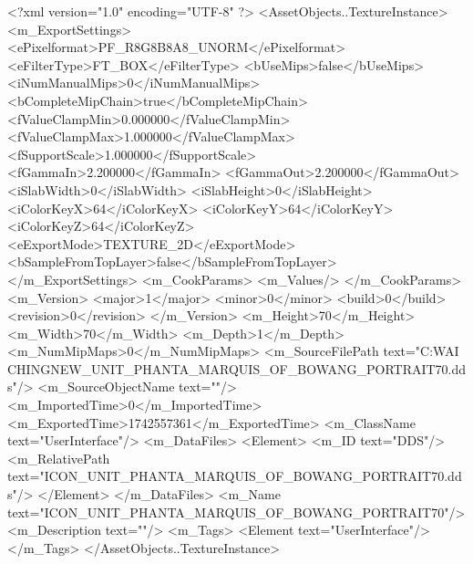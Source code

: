 <?xml version="1.0" encoding="UTF-8" ?>
<AssetObjects..TextureInstance>
	<m_ExportSettings>
		<ePixelformat>PF_R8G8B8A8_UNORM</ePixelformat>
		<eFilterType>FT_BOX</eFilterType>
		<bUseMips>false</bUseMips>
		<iNumManualMips>0</iNumManualMips>
		<bCompleteMipChain>true</bCompleteMipChain>
		<fValueClampMin>0.000000</fValueClampMin>
		<fValueClampMax>1.000000</fValueClampMax>
		<fSupportScale>1.000000</fSupportScale>
		<fGammaIn>2.200000</fGammaIn>
		<fGammaOut>2.200000</fGammaOut>
		<iSlabWidth>0</iSlabWidth>
		<iSlabHeight>0</iSlabHeight>
		<iColorKeyX>64</iColorKeyX>
		<iColorKeyY>64</iColorKeyY>
		<iColorKeyZ>64</iColorKeyZ>
		<eExportMode>TEXTURE_2D</eExportMode>
		<bSampleFromTopLayer>false</bSampleFromTopLayer>
	</m_ExportSettings>
	<m_CookParams>
		<m_Values/>
	</m_CookParams>
	<m_Version>
		<major>1</major>
		<minor>0</minor>
		<build>0</build>
		<revision>0</revision>
	</m_Version>
	<m_Height>70</m_Height>
	<m_Width>70</m_Width>
	<m_Depth>1</m_Depth>
	<m_NumMipMaps>0</m_NumMipMaps>
	<m_SourceFilePath text="C:\Users\YANG WAI CHING\Downloads\CIV\DDS NEW\ICON_UNIT_PHANTA_MARQUIS_OF_BOWANG_PORTRAIT70.dds"/>
	<m_SourceObjectName text=""/>
	<m_ImportedTime>0</m_ImportedTime>
	<m_ExportedTime>1742557361</m_ExportedTime>
	<m_ClassName text="UserInterface"/>
	<m_DataFiles>
		<Element>
			<m_ID text="DDS"/>
			<m_RelativePath text="ICON_UNIT_PHANTA_MARQUIS_OF_BOWANG_PORTRAIT70.dds"/>
		</Element>
	</m_DataFiles>
	<m_Name text="ICON_UNIT_PHANTA_MARQUIS_OF_BOWANG_PORTRAIT70"/>
	<m_Description text=""/>
	<m_Tags>
		<Element text="UserInterface"/>
	</m_Tags>
</AssetObjects..TextureInstance>


